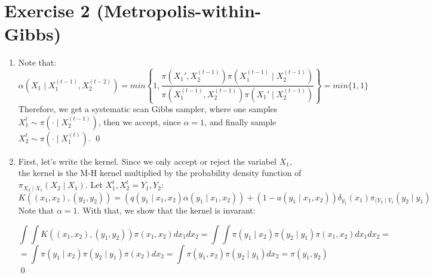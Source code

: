 \documentclass[12pt,letterpaper]{article}
\begin{document}
\section*{Exercise 2 (Metropolis-within-Gibbs)}
\begin{enumerate}[leftmargin=!,labelindent=5pt]
\item Note that:
$$
\alpha(X_1 \mid X_1^{(t-1)}, X_2^{(t-2)}) =
min \left\{
1,
\frac{\pi(X_1' , X_2^{(t-1)})\pi(X_1^{(t-1)}\mid X_2^{(t-1)})}
{\pi(X_1^{(t-1)} , X_2^{(t-1)})\pi(X_1'\mid X_2^{(t-1)})}
\right\} = min \{1, 1\}
$$
Therefore, we get a systematic scan Gibbs sampler, where one
samples $X^t_1 \sim \pi(\cdot \mid X_2^{(t-1)})$, then we accept,
since $\alpha=1$, and finally sample $X_2^t \sim
\pi(\cdot \mid X_1^{(t)})$.
\qed

\item First, let's write the kernel. Since we only accept or reject
the variabel $X_1$, the kernel is the M-H kernel multiplied by the
probability density function of $\pi_{X_2\mid X_1}(X_2\mid X_1)$. Let
$X_1^t, X_2^t = Y_1, Y_2$:
$$
K((x_1,x_2),(y_1, y_2)) =
(q(y_1 \mid x_1, x_2)\alpha(y_1 \mid x_1,x_2)) +
(1 - a(y_1 \mid x_1, x_2))\delta_{y_1}(x_1)\pi_{(Y_2\mid Y_1}(y_2 \mid y_1)
$$
Note that $\alpha = 1$. With that, we show that the kernel is invarant:

$$
\int \int
K((x_1,x_2),(y_1, y_2))\pi(x_1,x_2) dx_1 dx_2 =
\int \int \pi(y_1 \mid x_2)\pi(y_2 \mid y_1) \pi(x_1, x_2)dx_1 dx_2 =
$$
$$=
\int \pi(y_1 \mid x_2) \pi(y_2 \mid y_1) \pi(x_2) dx_2 =
\int \pi(y_1, x_2)\pi(y_2 \mid y_1) dx_2 = \pi(y_1, y_2)
$$
\qed

\end{enumerate}
\end{document}
